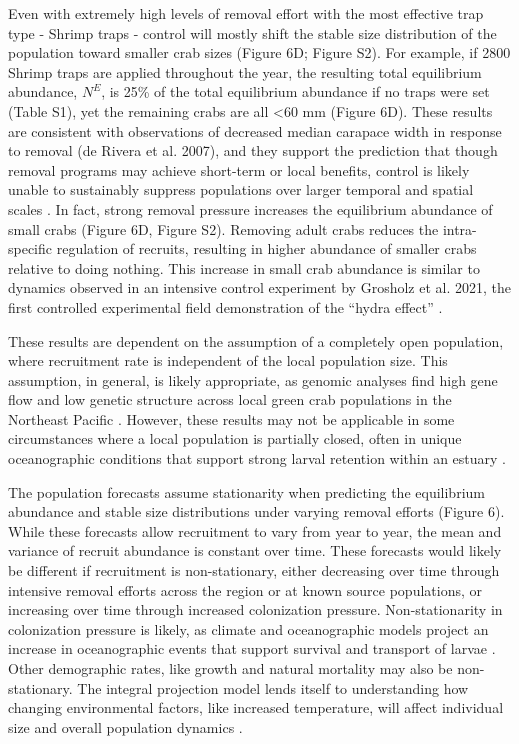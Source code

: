 \documentclass{article}
\begin{document}
Even with extremely high levels of removal effort with the most effective trap type - Shrimp traps - control will mostly shift the stable size distribution of the population toward smaller crab sizes (Figure 6D; Figure S2). For example, if 2800 Shrimp traps are applied throughout the year, the resulting total equilibrium abundance, $N^E$, is 25\% of the total equilibrium abundance if no traps were set (Table S1), yet the remaining crabs are all <60 mm (Figure 6D). These results are consistent with observations of decreased median carapace width in response to removal (de Rivera et al. 2007), and they support the prediction that though removal programs may achieve short-term or local benefits, control is likely unable to sustainably suppress populations over larger temporal and spatial scales \parencite{keller2025transition, tummon2024rebound, kanary2014modelling}. In fact, strong removal pressure increases the equilibrium abundance of small crabs (Figure 6D, Figure S2). Removing adult crabs reduces the intra-specific regulation of recruits, resulting in higher abundance of smaller crabs relative to doing nothing. This increase in small crab abundance is similar to dynamics observed in an intensive control experiment by Grosholz et al. 2021, the first controlled experimental field demonstration of the “hydra effect” \parencite{grosholz2021stage}.

These results are dependent on the assumption of a completely open population, where recruitment rate is independent of the local population size. This assumption, in general, is likely appropriate, as genomic analyses find high gene flow and low genetic structure across local green crab populations in the Northeast Pacific \parencite{tepolt2009european, tepolt2022balanced}. However, these results may not be applicable in some circumstances where a local population is partially closed, often in unique oceanographic conditions that support strong larval retention within an estuary \parencite{grosholz2021stage}. 

The population forecasts assume stationarity when predicting the equilibrium abundance and stable size distributions under varying removal efforts (Figure 6). While these forecasts allow recruitment to vary from year to year, the mean and variance of recruit abundance is constant over time. These forecasts would likely be different if recruitment is non-stationary, either decreasing over time through intensive removal efforts across the region or at known source populations, or increasing over time through increased colonization pressure. Non-stationarity in colonization pressure is likely, as climate and oceanographic models project an increase in oceanographic events that support survival and transport of larvae \parencite{du2024dispersal, cai2021changing}. Other demographic rates, like growth and natural mortality may also be non-stationary. The integral projection model lends itself to understanding how changing environmental factors, like increased temperature, will affect individual size and overall population dynamics \parencite{plard2019ipm, dahlgren2011incorporating}. 
\end{document}
